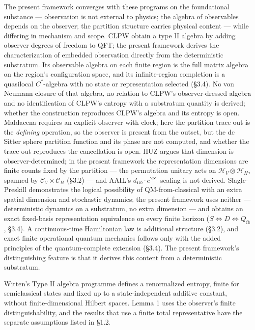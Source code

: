 \documentclass[
]{article}
\begin{document}
The present framework converges with these programs on the foundational
substance --- observation is not external to physics; the algebra of
observables depends on the observer; the partition structure carries
physical content --- while differing in mechanism and scope. CLPW obtain
a type II algebra by adding observer degrees of freedom to QFT; the
present framework derives the characterization of embedded observation
directly from the deterministic substratum. Its observable algebra on
each finite region is the full matrix algebra on the region's
configuration space, and its infinite-region completion is a quasilocal
\(C^{*}\)-algebra with no state or representation selected (§3.4). No
von Neumann closure of that algebra, no relation to CLPW's
observer-dressed algebra and no identification of CLPW's entropy with a
substratum quantity is derived; whether the construction reproduces
CLPW's algebra and its entropy is open. Maldacena requires an explicit
observer-with-clock; here the partition trace-out is the \emph{defining}
operation, so the observer is present from the outset, but the de Sitter
sphere partition function and its phase are not computed, and whether
the trace-out reproduces the cancellation is open. HUZ argues that
dimension is observer-determined; in the present framework the
representation dimensions are finite counts fixed by the partition ---
the permutation unitary acts on \(\mathcal{H}_V \otimes \mathcal{H}_H\),
spanned by \(\mathcal{C}_V \times \mathcal{C}_H\) (§3.2) --- and AAIL's
\(d_{Ob} \cdot e^{2S_0}\) scaling is not derived. Slagle-Preskill
demonstrates the logical possibility of QM-from-classical with an extra
spatial dimension and stochastic dynamics; the present framework uses
neither --- deterministic dynamics on a substratum, no extra dimension
--- and obtains an exact fixed-basis representation equivalence on every
finite horizon (\(S \iff D \iff Q_{\mathrm{fb}}\), §3.4). A
continuous-time Hamiltonian law is additional structure (§3.2), and
exact finite operational quantum mechanics follows only with the added
principles of the quantum-complete extension (§3.4). The present
framework's distinguishing feature is that it derives this content from
a deterministic substratum.

Witten's Type II algebra programme defines a renormalized entropy,
finite for semiclassical states and fixed up to a state-independent
additive constant, without finite-dimensional Hilbert spaces. Lemma 1
uses the observer's finite distinguishability, and the results that use
a finite total representative have the separate assumptions listed in
§1.2.
\end{document}
